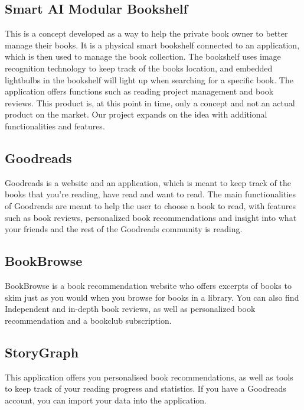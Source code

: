 \documentclass[conference]{IEEEtran}
\begin{document}
\subsection{Smart AI Modular Bookshelf} 
This is a concept developed as a way to help the private book owner to better manage their books. It is a physical smart bookshelf connected to an application, which is then used to manage the book collection. The bookshelf uses image recognition technology to keep track of the books location, and embedded lightbulbs in the bookshelf will light up when searching for a specific book. The application offers functions such as reading project management and book reviews. This product is, at this point in time, only a concept and not an actual product on the market. Our project expands on the idea with additional functionalities and features.\cite{Smartbookshelf}\\

\subsection{Goodreads} 
Goodreads is a website and an application, which is meant to keep track of the books that you’re reading, have read and want to read. The main functionalities of Goodreads are meant to help the user to choose a book to read, with features such as book reviews, personalized book recommendations and insight into what your friends and the rest of the Goodreads community is reading. \cite{Goodreads}\\

\subsection{BookBrowse} 
BookBrowse is a book recommendation website who offers excerpts of books to skim just as you would when you browse for books in a library. You can also find Independent and in-depth book reviews, as well as personalized book recommendation and a bookclub subscription. \cite{Bookbrowse}\\

\subsection{StoryGraph} 
This application offers you personalised book recommendations, as well as tools to keep track of your reading progress and statistics. If you have a Goodreads account, you can import your data into the application. \cite{Storygraph} \\
\end{document}
